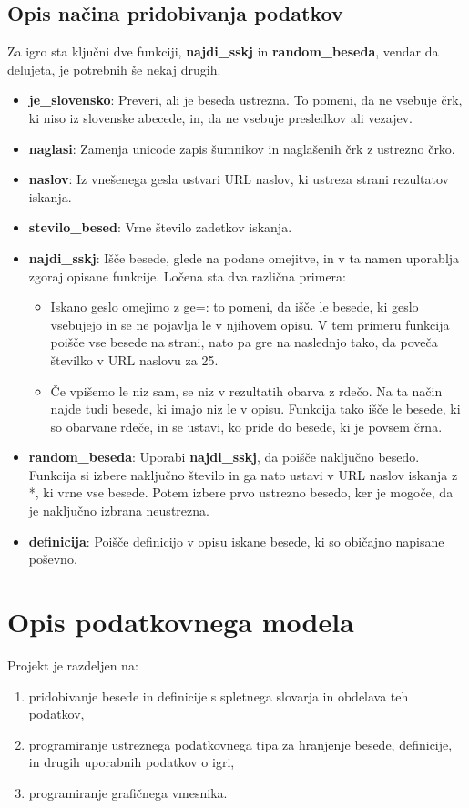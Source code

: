 \documentclass [a4paper, 12pt] {article}
\begin{document}
\subsection {Opis načina pridobivanja podatkov}
Za igro sta ključni dve funkciji, \textbf {najdi\_sskj} in \textbf {random\_beseda}, vendar da delujeta, je potrebnih še nekaj drugih.
\begin {itemize}
\item \textbf {je\_slovensko}: Preveri, ali je beseda ustrezna. To pomeni, da ne vsebuje črk, ki niso iz slovenske abecede, in, da ne vsebuje presledkov ali vezajev.
\item \textbf {naglasi}: Zamenja unicode zapis šumnikov in naglašenih črk z ustrezno črko.
\item \textbf {naslov}: Iz vnešenega gesla ustvari URL naslov, ki ustreza strani rezultatov iskanja.
\item \textbf {stevilo\_besed}: Vrne število zadetkov iskanja.
\item \textbf {najdi\_sskj}: Išče besede, glede na podane omejitve, in v ta namen uporablja zgoraj opisane funkcije. Ločena sta dva različna primera:
\begin {itemize}
\item Iskano geslo omejimo z ge=: to pomeni, da išče le besede, ki geslo vsebujejo in se ne pojavlja le v njihovem opisu. V tem primeru funkcija poišče vse besede na strani, nato pa gre na naslednjo tako, da poveča številko v URL naslovu za 25.
\item Če vpišemo le niz sam, se niz v rezultatih obarva z rdečo. Na ta način najde tudi besede, ki imajo niz le v opisu. Funkcija tako išče le besede, ki so obarvane rdeče, in se ustavi, ko pride do besede, ki je povsem črna.
\end {itemize}
\item \textbf {random\_beseda}: Uporabi \textbf {najdi\_sskj}, da poišče naključno besedo. Funkcija si izbere naključno število in ga nato ustavi v URL naslov iskanja z *, ki vrne vse besede. Potem izbere prvo ustrezno besedo, ker je mogoče, da je naključno izbrana neustrezna.
\item \textbf {definicija}: Poišče definicijo v opisu iskane besede, ki so običajno napisane poševno.
\end {itemize}     


\section {Opis podatkovnega modela}
Projekt je razdeljen na:
\begin {enumerate}
\item pridobivanje besede in definicije s spletnega slovarja in obdelava teh podatkov,
\item programiranje ustreznega podatkovnega tipa za hranjenje besede, definicije, in drugih uporabnih podatkov o igri,
\item programiranje grafičnega vmesnika.
\end {enumerate}
\end{document}
